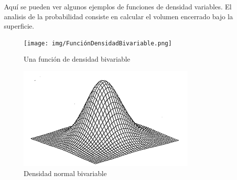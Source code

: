 \documentclass{article}
\begin{document}
Aquí se pueden ver algunos ejemplos de funciones de densidad variables. El
analisis de la probabilidad consiste en calcular el volumen encerrado
bajo la superficie.
\vspace*{\fill}
	\begin{figure}[htbp]
        \center
        \texttt{[image: img/FunciónDensidadBivariable.png]}
        \caption{Una función de densidad bivariable}
    \end{figure}
\vspace*{\fill}
\vspace*{\fill}
    \begin{figure}[htbp]
        \center
        \includegraphics[scale=1]{img/NormalBivariable.png}
        \caption{Densidad normal bivariable}
    \end{figure}
\vspace*{\fill}

\newpage
\end{document}
